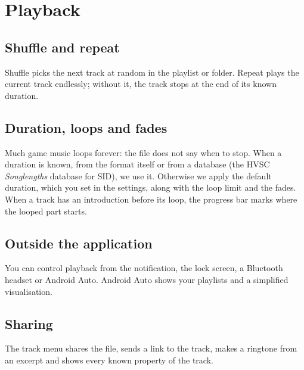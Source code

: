 \chapter{Playback}

\section{Shuffle and repeat}
Shuffle picks the next track at random in the playlist or folder. Repeat plays the current track endlessly; without
it, the track stops at the end of its known duration.

\section{Duration, loops and fades}
Much game music loops forever: the file does not say when to stop. When a duration is known, from the format itself
or from a database (the HVSC \emph{Songlengths} database for SID), we use it. Otherwise we apply the default
duration, which you set in the settings, along with the loop limit and the fades. When a track has an introduction
before its loop, the progress bar marks where the looped part starts.

\section{Outside the application}
You can control playback from the notification, the lock screen, a Bluetooth headset or Android Auto. Android Auto
shows your playlists and a simplified visualisation.

\section{Sharing}
The track menu shares the file, sends a link to the track, makes a ringtone from an excerpt and shows every known
property of the track.
